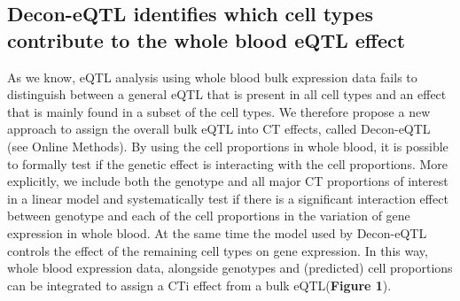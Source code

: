 \subsection{Decon-eQTL identifies which cell types contribute to the whole blood eQTL effect}
As we know, eQTL analysis using whole blood bulk expression data fails to distinguish between a general eQTL that is present in all cell types and an effect that is mainly found in a subset of the cell types. We therefore propose a new approach to assign the overall bulk eQTL into CT effects, called Decon-eQTL (see Online Methods). By using the cell proportions in whole blood, it is possible to formally test if the genetic effect is interacting with the cell proportions. More explicitly, we include both the genotype and all major CT proportions of interest in a linear model and systematically test if there is a significant interaction effect between genotype and each of the cell proportions in the variation of gene expression in whole blood. At the same time the model used by Decon-eQTL controls the effect of the remaining cell types on gene expression. In this way, whole blood expression data, alongside genotypes and (predicted) cell proportions can be integrated to assign a CTi effect from a bulk eQTL(\textbf{Figure 1}).

